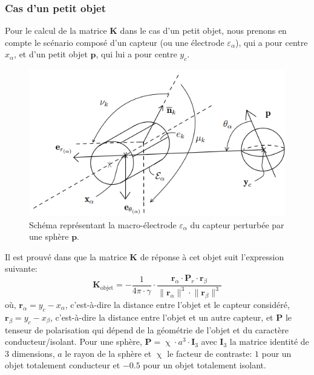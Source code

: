 \subsubsection{Cas d'un petit objet}
Pour le calcul de la matrice $\mathbf{K}$ dans le cas d'un petit objet, nous prenons en compte le scénario composé d'un capteur (ou une électrode $\varepsilon_{\alpha}$), qui a pour centre $x_\alpha$, et d'un petit objet $\mathbf{p}$, qui lui a pour centre $y_c$.
\begin{figure}[h!]
    \centering
    \includegraphics{doc/img/schema_petit_objet.png}
    \caption{Schéma représentant la macro-électrode $\varepsilon_{\alpha}$ du capteur perturbée par une sphère $\mathbf{p}$.}
    \label{fig:schema_petit_objet}
\end{figure}
Il est prouvé dans \cite{Boyer2012} que la matrice $\mathbf{K}$ de réponse à cet objet suit l'expression suivante: 
\begin{equation}
    \mathbf{K}_{\text{objet}} = - \frac{1}{4\pi \cdot \gamma} \cdot \frac{\mathbf{r}_\alpha \cdot \mathbf{P}_r \cdot \mathbf{r}_\beta}{\lVert \mathbf{r}_\alpha \rVert^3 \cdot \lVert \mathbf{r}_\beta \rVert^3}
\end{equation}
où, $\mathbf{r}_\alpha = y_c - x_\alpha$, c'est-à-dire la distance entre l'objet et le capteur considéré, $\mathbf{r}_\beta = y_c - x_\beta$, c'est-à-dire la distance entre l'objet et un autre capteur, et $\mathbf{P}$ le tenseur de polarisation qui dépend de la géométrie de l'objet et du caractère conducteur/isolant. Pour une sphère, $\mathbf{P} = \upchi \cdot a^3 \cdot \mathbf{I}_{3}$ avec $\mathbf{I}_3$ la matrice identité de $3$ dimensions, $a$ le rayon de la sphère et $\upchi$ le facteur de contraste: $1$ pour un objet totalement conducteur et $-0.5$ pour un objet totalement isolant.

